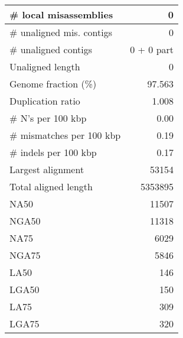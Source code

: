 \documentclass[12pt,a4paper]{article}
\begin{document}
\begin{table}[ht]
\begin{center}
\begin{tabular}{|l*{1}{|r}|}
\# local misassemblies & 0 \\ \hline
\# unaligned mis. contigs & 0 \\ \hline
\# unaligned contigs & 0 + 0 part \\ \hline
Unaligned length & 0 \\ \hline
Genome fraction (\%) & 97.563 \\ \hline
Duplication ratio & 1.008 \\ \hline
\# N's per 100 kbp & 0.00 \\ \hline
\# mismatches per 100 kbp & 0.19 \\ \hline
\# indels per 100 kbp & 0.17 \\ \hline
Largest alignment & 53154 \\ \hline
Total aligned length & 5353895 \\ \hline
NA50 & 11507 \\ \hline
NGA50 & 11318 \\ \hline
NA75 & 6029 \\ \hline
NGA75 & 5846 \\ \hline
LA50 & 146 \\ \hline
LGA50 & 150 \\ \hline
LA75 & 309 \\ \hline
LGA75 & 320 \\ \hline
\end{tabular}
\end{center}
\end{table}
\end{document}
